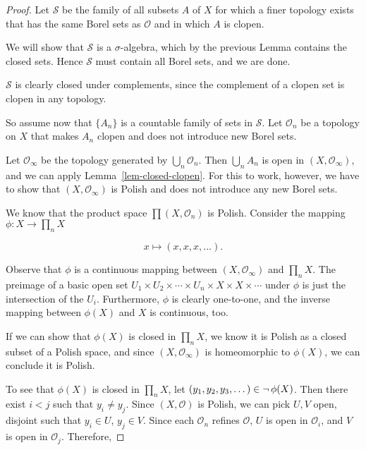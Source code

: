 \begin{theorem}
\end{theorem}\begin{proof}Let $\mathcal{S}$ be the family of all subsets $A$ of $X$ for which a finer topology exists that has the same Borel sets as $\mathcal{O}$ and in which $A$ is clopen.

We will show that $\mathcal{S}$ is a $\sigma$-algebra, which by the previous Lemma contains the closed sets. Hence $\mathcal{S}$ must contain all Borel sets, and we are done.

$\mathcal{S}$ is clearly closed under complements, since the complement of a clopen set is clopen in any topology.

So assume now that $\{A_n\}$ is a countable family of sets in $\mathcal{S}$. Let $\mathcal{O}_n$ be a topology on $X$ that makes $A_n$ clopen and does not introduce new Borel sets.

Let $\mathcal{O}_\infty$ be the topology generated by $\bigcup_n \mathcal{O}_n$. Then $\bigcup_n A_n$ is open in $(X, \mathcal{O}_\infty)$, and we can apply Lemma~\ref{lem-closed-clopen}. For this to work, however, we have to show that $(X, \mathcal{O}_\infty)$ is Polish and does not introduce any new Borel sets.

We know that the product space $\prod (X,\mathcal{O}_n)$ is Polish. Consider the mapping $\phi: X \to \prod_n X$

\begin{equation}
x \mapsto (x,x,x, \dots).
\end{equation}

Observe that $\phi$ is a continuous mapping between $(X,\mathcal{O}_{\infty})$ and $\prod_n X$.  The preimage of a basic open set $U_1 \times U_2 \times \cdots \times U_n \times X \times X \times \cdots$ under $\phi$ is just the intersection of the $U_i$. Furthermore, $\phi$ is clearly one-to-one, and the inverse mapping between $\phi(X)$ and $X$ is continuous, too.

If we can show that $\phi(X)$ is closed in $\prod_n X$, we know it is Polish as a closed subset of a Polish space, and since $(X,\mathcal{O}_\infty)$ is homeomorphic to $\phi(X)$, we can conclude it is Polish.

To see that $\phi(X)$ is closed in $\prod_n X$, let $(y_1,y_2,y_3, \dots) \in \neg \, \phi(X)$. Then there exist $i < j$ such that $y_i \neq y_j$. Since $(X, \mathcal{O})$ is Polish, we can pick $U,V$ open, disjoint such that $y_i \in U$, $y_j \in V$. Since each $\mathcal{O}_n$ refines $\mathcal{O}$, $U$ is open in $\mathcal{O}_i$, and $V$ is open in $\mathcal{O}_j$. Therefore,


\end{proof}
